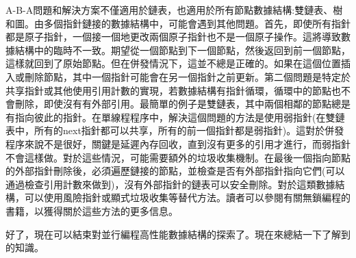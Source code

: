 A-B-A問題和解決方案不僅適用於鏈表，也適用於所有節點數據結構:雙鏈表、樹和圖。由多個指針鏈接的數據結構中，可能會遇到其他問題。首先，即使所有指針都是原子指針，一個接一個地更改兩個原子指針也不是一個原子操作。這將導致數據結構中的臨時不一致。期望從一個節點到下一個節點，然後返回到前一個節點，這樣就回到了原始節點。但在併發情況下，這並不總是正確的。如果在這個位置插入或刪除節點，其中一個指針可能會在另一個指針之前更新。第二個問題是特定於共享指針或其他使用引用計數的實現，若數據結構有指針循環，循環中的節點也不會刪除，即使沒有有外部引用。最簡單的例子是雙鏈表，其中兩個相鄰的節點總是有指向彼此的指針。在單線程程序中，解決這個問題的方法是使用弱指針(在雙鏈表中，所有的next指針都可以共享，所有的前一個指針都是弱指針)。這對於併發程序來說不是很好，關鍵是延遲內存回收，直到沒有更多的引用才進行，而弱指針不會這樣做。對於這些情況，可能需要額外的垃圾收集機制。在最後一個指向節點的外部指針刪除後，必須遍歷鏈接的節點，並檢查是否有外部指針指向它們(可以通過檢查引用計數來做到)，沒有外部指針的鏈表可以安全刪除。對於這類數據結構，可以使用風險指針或顯式垃圾收集等替代方法。讀者可以參閱有關無鎖編程的書籍，以獲得關於這些方法的更多信息。

好了，現在可以結束對並行編程高性能數據結構的探索了。現在來總結一下了解到的知識。













